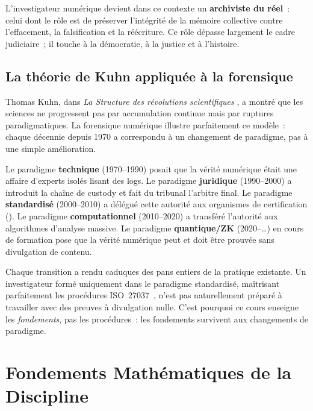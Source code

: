 L'investigateur numérique devient dans ce contexte un
\textbf{archiviste du réel}~: celui dont le rôle
est de préserver l'intégrité de la mémoire collective contre l'effacement,
la falsification et la réécriture. Ce rôle dépasse largement le cadre
judiciaire~; il touche à la démocratie, à la justice et à l'histoire.

\subsection{La théorie de Kuhn appliquée à la forensique}

Thomas Kuhn, dans \textit{La Structure des révolutions scientifiques}
\cite{kuhn1962}, a montré que les sciences ne progressent pas par accumulation
continue mais par ruptures paradigmatiques. La forensique numérique illustre
parfaitement ce modèle~: chaque décennie depuis 1970 a correspondu à un
changement de paradigme, pas à une simple amélioration.

\medskip

Le paradigme \textbf{technique} (1970--1990) posait que la vérité numérique
était une affaire d'experts isolés lisant des logs. Le paradigme
\textbf{juridique} (1990--2000) a introduit la chaîne de custody et fait
du tribunal l'arbitre final. Le paradigme \textbf{standardisé} (2000--2010)
a délégué cette autorité aux organismes de certification ().
Le paradigme \textbf{computationnel} (2010--2020) a transféré l'autorité
aux algorithmes d'analyse massive. Le paradigme \textbf{quantique/ZK}
(2020--\ldots) en cours de formation pose que la vérité numérique peut et
doit être prouvée sans divulgation de contenu.

\medskip

Chaque transition a rendu caduques des pans entiers de la pratique
existante. Un investigateur formé uniquement dans le paradigme standardisé, maîtrisant parfaitement les procédures ISO~27037~\cite{iso27037}, n'est pas
naturellement préparé à travailler avec des preuves à divulgation nulle.
C'est pourquoi ce cours enseigne les \emph{fondements}, pas les procédures~:
les fondements survivent aux changements de paradigme.

\section{Fondements Mathématiques de la Discipline}

